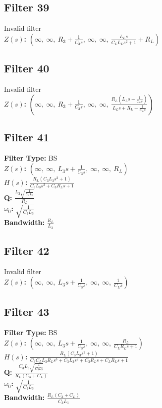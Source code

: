 \documentclass{article}
\begin{document}
\subsection*{Filter 39}
Invalid filter \\ 
\textbf{$Z(s)$:} $\left( \infty, \  \infty, \  R_{3} + \frac{1}{C_{3} s}, \  \infty, \  \infty, \  \frac{L_{L} s}{C_{L} L_{L} s^{2} + 1} + R_{L}\right)$ \\ 
\subsection*{Filter 40}
Invalid filter \\ 
\textbf{$Z(s)$:} $\left( \infty, \  \infty, \  R_{3} + \frac{1}{C_{3} s}, \  \infty, \  \infty, \  \frac{R_{L} \left(L_{L} s + \frac{1}{C_{L} s}\right)}{L_{L} s + R_{L} + \frac{1}{C_{L} s}}\right)$ \\ 
\subsection*{Filter 41}
\textbf{Filter Type:} BS \\ 
\textbf{$Z(s)$:} $\left( \infty, \  \infty, \  L_{3} s + \frac{1}{C_{3} s}, \  \infty, \  \infty, \  R_{L}\right)$ \\ 
\textbf{$H(s)$:} $\frac{R_{L} \left(C_{3} L_{3} s^{2} + 1\right)}{C_{3} L_{3} s^{2} + C_{3} R_{L} s + 1}$ \\ 
\textbf{Q:} $\frac{L_{3} \sqrt{\frac{1}{C_{3} L_{3}}}}{R_{L}}$ \\ 
\textbf{$\omega_0$:} $\sqrt{\frac{1}{C_{3} L_{3}}}$ \\ 
\textbf{Bandwidth:} $\frac{R_{L}}{L_{3}}$ \\ 
\subsection*{Filter 42}
Invalid filter \\ 
\textbf{$Z(s)$:} $\left( \infty, \  \infty, \  L_{3} s + \frac{1}{C_{3} s}, \  \infty, \  \infty, \  \frac{1}{C_{L} s}\right)$ \\ 
\subsection*{Filter 43}
\textbf{Filter Type:} BS \\ 
\textbf{$Z(s)$:} $\left( \infty, \  \infty, \  L_{3} s + \frac{1}{C_{3} s}, \  \infty, \  \infty, \  \frac{R_{L}}{C_{L} R_{L} s + 1}\right)$ \\ 
\textbf{$H(s)$:} $\frac{R_{L} \left(C_{3} L_{3} s^{2} + 1\right)}{C_{3} C_{L} L_{3} R_{L} s^{3} + C_{3} L_{3} s^{2} + C_{3} R_{L} s + C_{L} R_{L} s + 1}$ \\ 
\textbf{Q:} $\frac{C_{3} L_{3} \sqrt{\frac{1}{C_{3} L_{3}}}}{R_{L} \left(C_{3} + C_{L}\right)}$ \\ 
\textbf{$\omega_0$:} $\sqrt{\frac{1}{C_{3} L_{3}}}$ \\ 
\textbf{Bandwidth:} $\frac{R_{L} \left(C_{3} + C_{L}\right)}{C_{3} L_{3}}$ \\ 
\end{document}
